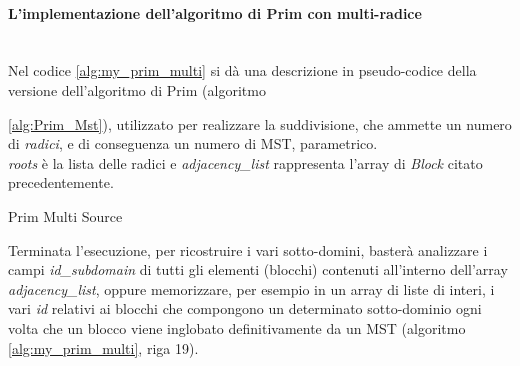 \paragraph{L'implementazione dell'algoritmo di Prim con multi-radice}~\\
Nel codice \ref{alg:my_prim_multi} si dà una descrizione in pseudo-codice della versione dell'algoritmo di Prim (algoritmo {\ref{alg:Prim_Mst}), utilizzato per realizzare la suddivisione, che ammette un numero di \emph{radici}, e di conseguenza un numero di MST, parametrico.\\
\textit{roots} è la lista delle radici e \textit{adjacency\_list} rappresenta l'array di \textit{Block} citato precedentemente.
\begin{algorithm}[H]
	\caption{Prim Multi Source}
	\label{alg:my_prim_multi}
	\begin{algorithmic}[1]
		\Statex
		
		\State{\color{blue}{//Inizializzazione di tutti i vertici}}
		\EndFor
		
		\State{\color{blue}{//Inizializzazione di tutte le radici}}
		\EndFor
		
		
		\State{\color{blue}{//Essendo il minimo viene aggiunto definitivamente}}
		\State{\color{blue}{//Si analizzano i vicini}}
		\State{\color{blue}{//In questo caso specifico il peso di ogni arco vale 1}}
		\EndIf
		\EndFor
		\EndIf
		\EndWhile
		\State \Return{}
		\EndFunction
	\end{algorithmic}
\end{algorithm}
Terminata l'esecuzione, per ricostruire i vari sotto-domini, basterà analizzare i campi \textit{id\_subdomain} di tutti gli elementi (blocchi) contenuti all'interno dell'array \textit{adjacency\_list}, oppure memorizzare, per esempio in un array di liste di interi, i vari \textit{id} relativi ai blocchi che compongono un determinato sotto-dominio ogni volta che un blocco viene inglobato definitivamente da un MST (algoritmo \ref{alg:my_prim_multi}, riga 19).

}
